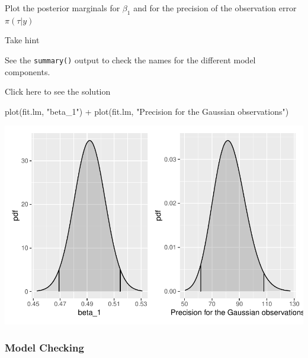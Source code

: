 \documentclass[
  letterpaper,
  DIV=11,
  numbers=noendperiod]{scrartcl}
\newenvironment{Shaded}{\begin{snugshade}}{\end{snugshade}}
\newcommand{\FunctionTok}[1]{\textcolor[rgb]{0.28,0.35,0.67}{#1}}
\newcommand{\NormalTok}[1]{\textcolor[rgb]{0.00,0.23,0.31}{#1}}
\newcommand{\SpecialCharTok}[1]{\textcolor[rgb]{0.37,0.37,0.37}{#1}}
\newcommand{\StringTok}[1]{\textcolor[rgb]{0.13,0.47,0.30}{#1}}
\begin{document}
\begin{tcolorbox}[enhanced jigsaw, colbacktitle=quarto-callout-warning-color!10!white, breakable, toptitle=1mm, title={Task}, colback=white, leftrule=.75mm, bottomtitle=1mm, bottomrule=.15mm, coltitle=black, colframe=quarto-callout-warning-color-frame, titlerule=0mm, toprule=.15mm, arc=.35mm, opacitybacktitle=0.6, left=2mm, opacityback=0, rightrule=.15mm]

Plot the posterior marginals for \(\beta_1\) and for the precision of
the observation error \(\pi(\tau|y)\)

Take hint

See the \texttt{summary()} output to check the names for the different
model components.

Click here to see the solution

\begin{Shaded}
\begin{Highlighting}[]
\FunctionTok{plot}\NormalTok{(fit.lm, }\StringTok{"beta\_1"}\NormalTok{) }\SpecialCharTok{+}
\FunctionTok{plot}\NormalTok{(fit.lm, }\StringTok{"Precision for the Gaussian observations"}\NormalTok{)}
\end{Highlighting}
\end{Shaded}

\begin{center}
\includegraphics{day1_practical_2_files/figure-pdf/unnamed-chunk-11-1.pdf}
\end{center}

\end{tcolorbox}

\subsubsection{Model Checking}\label{model-checking}
\end{document}
